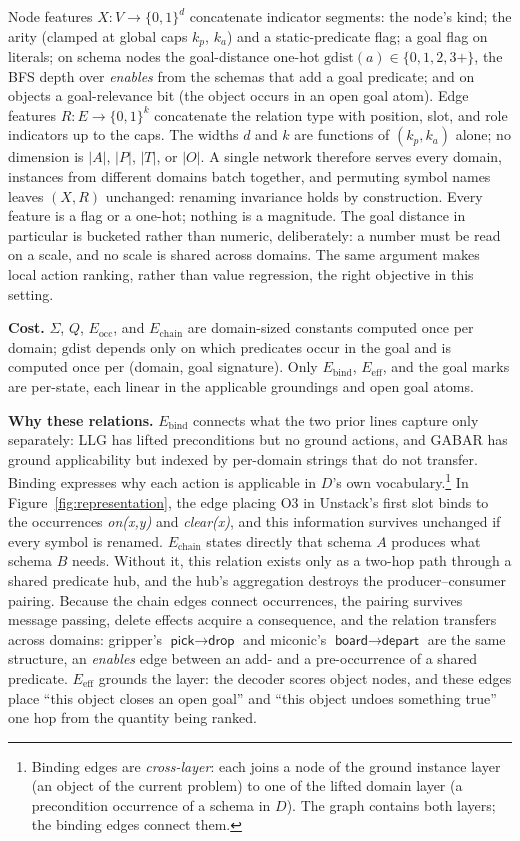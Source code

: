 \documentclass[letterpaper]{article} %
\begin{document}
Node features $X : V \to \{0,1\}^{d}$ concatenate indicator segments: the
node's kind; the arity (clamped at global caps $k_p$, $k_a$) and a
static-predicate flag; a goal flag on literals; on schema nodes the
goal-distance one-hot $\mathrm{gdist}(a) \in \{0, 1, 2, 3{+}\}$, the BFS
depth over \textit{enables} from the schemas that add a goal predicate; and
on objects a goal-relevance bit (the object occurs in an open goal atom).
Edge features $R : E \to \{0,1\}^{k}$ concatenate the relation type with
position, slot, and role indicators up to the caps. The widths $d$ and $k$
are functions of $(k_p, k_a)$ alone; no dimension is $|A|$, $|P|$,
$|T|$, or $|O|$. A single network therefore serves every domain, instances from
different domains batch together, and permuting symbol names leaves
$(X, R)$ unchanged: renaming invariance holds by construction. Every
feature is a flag or a one-hot; nothing is a magnitude. The goal distance
in particular is bucketed rather than numeric, deliberately: a number must
be read on a scale, and no scale is shared across domains. The same
argument makes local action ranking, rather than value regression, the
right objective in this setting.

\textbf{Cost.} $\Sigma$, $Q$, $E_{\mathrm{occ}}$, and $E_{\mathrm{chain}}$
are domain-sized constants computed once per domain; $\mathrm{gdist}$
depends only on which predicates occur in the goal and is computed once per
(domain, goal signature). Only $E_{\mathrm{bind}}$, $E_{\mathrm{eff}}$, and
the goal marks are per-state, each linear in the applicable groundings and
open goal atoms.

\textbf{Why these relations.} $E_{\mathrm{bind}}$ connects what the two
prior lines capture only separately: LLG has lifted preconditions but no
ground actions, and GABAR has ground applicability but indexed by
per-domain strings that do not transfer. Binding expresses why each action is applicable in $D$'s own
vocabulary.\footnote{Binding edges are \emph{cross-layer}: each joins a
node of the ground instance layer (an object of the current problem) to one
of the lifted domain layer (a precondition occurrence of a schema in $D$).
The graph contains both layers; the binding edges connect them.} In
Figure~\ref{fig:representation}, the edge placing O3 in Unstack's first
slot binds to the occurrences \emph{on(x,y)} and \emph{clear(x)}, and this
information survives unchanged if every symbol is renamed.
$E_{\mathrm{chain}}$ states directly that schema $A$ produces what schema
$B$ needs. Without it, this relation exists only as a two-hop path through
a shared predicate hub, and the hub's aggregation destroys the
producer--consumer pairing. Because the chain edges connect occurrences,
the pairing survives message passing, delete effects acquire a consequence,
and the relation transfers across domains: gripper's
$\textsf{pick} \rightarrow \textsf{drop}$ and miconic's
$\textsf{board} \rightarrow \textsf{depart}$ are the same structure, an
\textit{enables} edge between an add- and a pre-occurrence of a shared
predicate. $E_{\mathrm{eff}}$ grounds the layer: the decoder scores object
nodes, and these edges place ``this object closes an open goal'' and ``this
object undoes something true'' one hop from the quantity being ranked.
\end{document}
